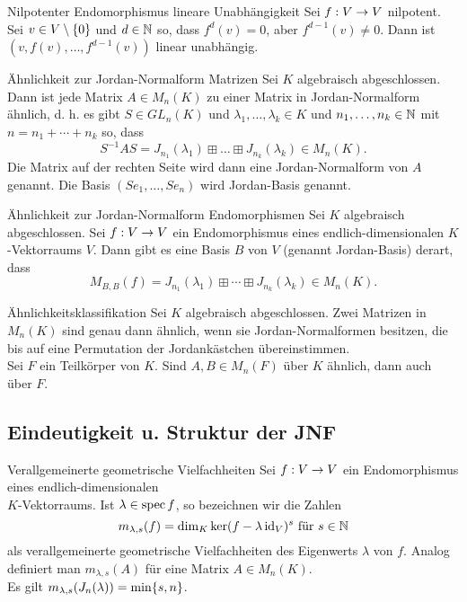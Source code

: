 \documentclass[main.tex]{subfiles}
\begin{document}
\begin{karte}{Nilpotenter Endomorphismus \textendash{} lineare Unabhängigkeit}
    Sei \(f : V \rightarrow V\) nilpotent. Sei \(v \in V\setminus \{0\}\)
    und \(d \in \mathbb{N}\) so, dass \(f^d(v) = 0\), aber \(f^{d-1}(v) \neq 0\).
    Dann ist \((v,f(v),\ldots, f^{d-1}(v))\) linear unabhängig.
\end{karte}

\begin{karte}{Ähnlichkeit zur Jordan-Normalform \textendash{} Matrizen}
    Sei \(K\) algebraisch abgeschlossen. Dann ist jede Matrix \(A \in M_n(K)\)
    zu einer Matrix in Jordan-Normalform ähnlich, d. h. es gibt \(S \in GL_n(K)\)
    und \(\lambda_1, \ldots, \lambda_k \in K\) und \(n_1, \ldots, n_k \in \mathbb{N}\)
    mit \(n = n_1 + \cdots + n_k\) so, dass
    \[ S^{-1}AS = J_{n_1}(\lambda_1) \boxplus \ldots \boxplus 
    J_{n_k}(\lambda_k) \in M_n(K). \]
    Die Matrix auf der rechten Seite wird dann eine Jordan-Normalform von \(A\)
    genannt. Die Basis \((Se_1, \ldots, Se_n)\) wird Jordan-Basis genannt.
\end{karte}

\begin{karte}{Ähnlichkeit zur Jordan-Normalform \textendash{} Endomorphismen}
    Sei \(K\) algebraisch abgeschlossen. Sei \(f : V \rightarrow V\) ein Endomorphismus
    eines endlich-dimensionalen \(K\)-Vektorraums \(V\). Dann gibt es eine Basis
    \(B\) von \(V\) (genannt Jordan-Basis) derart, dass
    \[ M_ {B,B}(f) = J_{n_1}(\lambda_1) \boxplus \cdots \boxplus J_{n_k}(\lambda_k)
    \in M_n(K). \]
\end{karte}

\begin{karte}{Ähnlichkeitsklassifikation}
    Sei \(K\) algebraisch abgeschlossen. Zwei Matrizen in \(M_n(K)\) sind genau dann 
    ähnlich, wenn sie Jordan-Normalformen besitzen, die bis auf eine Permutation der 
    Jordankästchen übereinstimmen.\\
    Sei \(F\) ein Teilkörper von \(K\). Sind \(A, B \in M_n(F)\) über \(K\)
    ähnlich, dann auch über \(F\).
\end{karte}

\subsection*{Eindeutigkeit u. Struktur der JNF}

\begin{karte}{Verallgemeinerte geometrische Vielfachheiten}
    Sei \(f : V \rightarrow V\) ein Endomorphismus eines endlich-dimensionalen \\
    \(K\)-Vektorraums. Ist \(\lambda \in \operatorname{spec} f\), so bezeichnen wir die Zahlen
    \[ m_{\lambda, s}(f) = \dim_K \ker(f-\lambda \operatorname{id}_V)^s \text{ für } s \in \mathbb{N} \]
    als verallgemeinerte geometrische Vielfachheiten des Eigenwerts
    \(\lambda\) von \(f\). Analog definiert man \(m_{\lambda, s}(A)\) für eine Matrix
    \(A \in M_n(K)\).\\
    Es gilt \(m_{\lambda, s}(J_n(\lambda)) = \min\{s,n\}\).
\end{karte}
\end{document}

